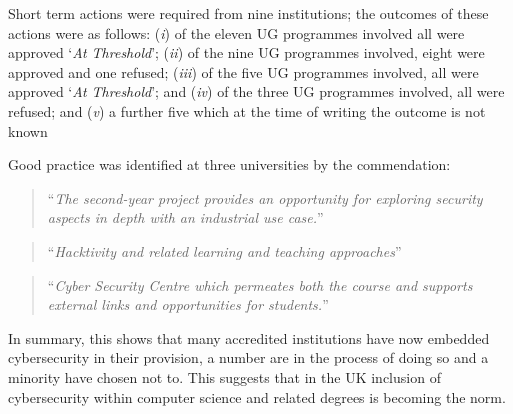 \documentclass[sigconf]{acmart}
\begin{document}
Short term actions were required from nine institutions; the outcomes of these actions were as follows: ({\emph{i}}) of the eleven UG programmes involved all were approved `{\emph{At Threshold}}'; ({\emph{ii}}) of the nine UG programmes involved, eight were approved and one refused; ({\emph{iii}}) of the five UG programmes involved, all were approved `{\emph{At Threshold}}'; and ({\emph{iv}}) of the three UG programmes involved, all were refused; and ({\emph{v}}) a further five which at the time of writing the outcome is not known


Good practice was identified at three universities by the commendation:

\begin{quote}
	``{\emph{The second-year project provides an opportunity for exploring security aspects in depth with an industrial use case.}}''
\end{quote}
\begin{quote}
	``{\emph{Hacktivity and related learning and teaching approaches}}''
\end{quote}
\begin{quote}
	``{\emph{Cyber Security Centre which permeates both the course and supports external links and opportunities for students.}}''
\end{quote}

In summary, this shows that many accredited institutions have now embedded cybersecurity in their provision, a number are in the process of doing so and a minority have chosen not to. This suggests that in the UK inclusion of cybersecurity within computer science and related degrees is becoming the norm. 
\end{document}
